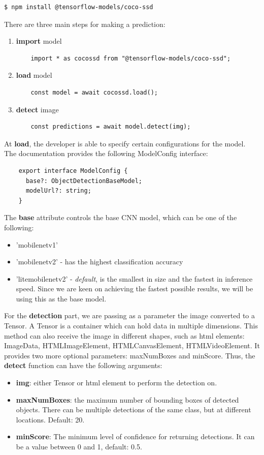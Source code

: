 \documentclass[runningheads,a4paper,11pt]{report}
\begin{document}
\begin{lstlisting}[language=bash]
    $ npm install @tensorflow-models/coco-ssd
\end{lstlisting}
There are three main steps for making a prediction:
\begin{enumerate}
  \item \textbf{import} model
  \begin{lstlisting}
    import * as cocossd from "@tensorflow-models/coco-ssd";
  \end{lstlisting}
  \item \textbf{load} model
  \begin{lstlisting}
    const model = await cocossd.load();
  \end{lstlisting}
  \item \textbf{detect} image
  \begin{lstlisting}
    const predictions = await model.detect(img);
  \end{lstlisting}
\end{enumerate}
At \textbf{load}, the developer is able to specify certain configurations for the model. The documentation provides the following ModelConfig interface: 
    \begin{lstlisting}
    export interface ModelConfig {
      base?: ObjectDetectionBaseModel;
      modelUrl?: string;
    }
    \end{lstlisting}
The \textbf{base} attribute controls the base CNN model, which can be one of the following:
\begin{itemize}
  \item 'mobilenet\textunderscore v1' 
  \item 'mobilenet\textunderscore v2' - has the highest classification accuracy
  \item 'lite\textunderscore mobilenet\textunderscore v2' - \textit{default}, is the smallest in size and the fastest in inference speed. Since we are keen on achieving the fastest possible results, we will be using this as the base model.
\end{itemize}

For the \textbf{detection} part, we are passing as a parameter the image converted to a Tensor. A Tensor is a container which can hold data in multiple dimensions. This method can also receive the image in different shapes, such as html elements: ImageData, HTMLImageElement, HTMLCanvasElement, HTMLVideoElement. It provides two more optional parameters: maxNumBoxes and minScore. Thus, the \textbf{detect} function can have the following arguments:
\begin{itemize}
  \item \textbf{img}: either Tensor or html element to perform the detection on.
  \item \textbf{maxNumBoxes}: the maximum number of bounding boxes of detected objects. There can be multiple detections of the same class, but at different locations. Default: 20.
  \item \textbf{minScore}: The minimum level of confidence for returning detections. It can be a value between 0 and 1, default: 0.5. 
\end{itemize}
\end{document}
